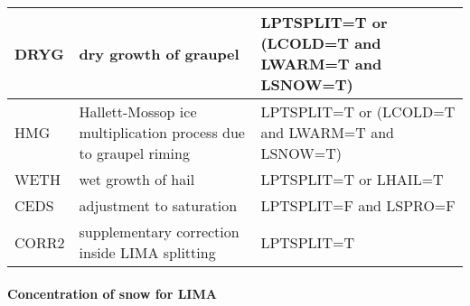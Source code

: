 \begin{longtable} {|p{}|p{}|p{}|}
DRYG   & dry growth of graupel                          & LPTSPLIT=T or (LCOLD=T and LWARM=T and LSNOW=T) \\\hline
HMG    & Hallett-Mossop ice multiplication process due to graupel riming & LPTSPLIT=T or (LCOLD=T and LWARM=T and LSNOW=T) \\\hline
WETH   & wet growth of hail                             & LPTSPLIT=T or LHAIL=T \\\hline
CEDS   & adjustment to saturation                       & LPTSPLIT=F and LSPRO=F \\\hline
CORR2  & supplementary correction inside LIMA splitting & LPTSPLIT=T \\\hline
\end{longtable}

\paragraph{Concentration of snow for LIMA}
\mbox{} %

